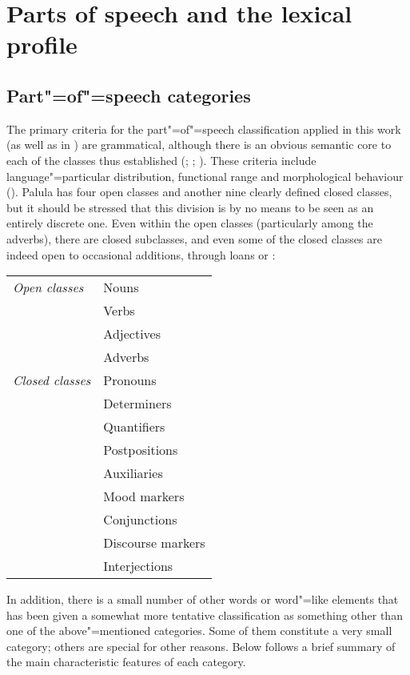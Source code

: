 \chapter{Parts of speech and the lexical profile}
\label{chap:3b}
\section{Part"=of"=speech categories}
\label{sec:3b-1}


The primary criteria for the part"=of"=speech classification applied in this work (as well as in \citealt{liljegrenhaider2011}) are grammatical, although there is an obvious semantic core to each of the classes thus established (\citealt[49-54]{givon2001a}; \citealt[47-54, 102-106]{dixon2010}; \citealt[183-188]{croft2003}). These criteria include language"=particular distribution, functional range and morphological behaviour (\citealt[1-3]{schachtershopen2007}). Palula has four open classes and another nine clearly defined closed classes, but it should be stressed that this division is by no means to be seen as an entirely discrete one. Even within the open classes (particularly among the adverbs), there are closed subclasses, and even some of the closed classes are indeed open to occasional additions, through loans or :


\begin{table}[H]
\begin{tabularx}{\textwidth}{ l@{\hspace{30pt}} Q }
\textit{Open classes} &
Nouns\\
&
Verbs\\
&
Adjectives\\
&
Adverbs\\
\textit{Closed classes} &
Pronouns\\
&
Determiners\\
&
Quantifiers\\
&
Postpositions\\
&
Auxiliaries\\
&
Mood markers\\
&
Conjunctions\\
&
Discourse markers\\
&
Interjections\\
\end{tabularx}
\end{table}


In addition, there is a small number of other words or word"=like elements that has been given a somewhat more tentative classification as something other than one of the above"=mentioned categories. Some of them constitute a very small category; others are special for other reasons. Below follows a brief summary of the main characteristic features of each category.


